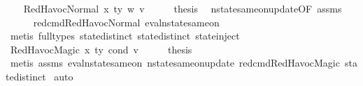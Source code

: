 \begin{isabellebody}
\isamarkupfalse%
\isanewline
\ \ \isamarkupfalse%
\ {\isacharparenleft}{\kern0pt}RedHavocNormal\ x\ ty\ w\ v{\isacharparenright}{\kern0pt}\isanewline
\ \ \isamarkupfalse%
\ \isamarkupfalse%
\ {\isacharquery}{\kern0pt}thesis\ \isamarkupfalse%
\ nstate{\isacharunderscore}{\kern0pt}same{\isacharunderscore}{\kern0pt}on{\isacharunderscore}{\kern0pt}update{\isacharunderscore}{\kern0pt}{}{\isacharbrackleft}{\kern0pt}OF\ assms{\isacharparenleft}{\kern0pt}{}{\isacharparenright}{\kern0pt}{\isacharbrackright}{\kern0pt}\isanewline
\ \ \ \ \isamarkupfalse%
\ red{\isacharunderscore}{\kern0pt}cmd{\isachardot}{\kern0pt}RedHavocNormal\ eval{\isacharunderscore}{\kern0pt}nstate{\isacharunderscore}{\kern0pt}same{\isacharunderscore}{\kern0pt}on{\isacharparenleft}{\kern0pt}{}{\isacharparenright}{\kern0pt}\isanewline
\ \ \ \ \isamarkupfalse%
\ {\isacharparenleft}{\kern0pt}metis\ {\isacharparenleft}{\kern0pt}full{\isacharunderscore}{\kern0pt}types{\isacharparenright}{\kern0pt}\ state{\isachardot}{\kern0pt}distinct{\isacharparenleft}{\kern0pt}{}{\isacharparenright}{\kern0pt}\ state{\isachardot}{\kern0pt}distinct{\isacharparenleft}{\kern0pt}{}{\isacharparenright}{\kern0pt}\ state{\isachardot}{\kern0pt}inject{\isacharparenright}{\kern0pt}\isanewline
{}\isamarkupfalse%
\isanewline
\ \ \isamarkupfalse%
\ {\isacharparenleft}{\kern0pt}RedHavocMagic\ x\ ty\ cond\ v{\isacharparenright}{\kern0pt}\isanewline
\ \ \isamarkupfalse%
\ \isamarkupfalse%
\ {\isacharquery}{\kern0pt}thesis\isanewline
\ \ \isamarkupfalse%
\ {\isacharparenleft}{\kern0pt}metis\ assms{\isacharparenleft}{\kern0pt}{}{\isacharparenright}{\kern0pt}\ eval{\isacharunderscore}{\kern0pt}nstate{\isacharunderscore}{\kern0pt}same{\isacharunderscore}{\kern0pt}on{\isacharparenleft}{\kern0pt}{}{\isacharparenright}{\kern0pt}\ nstate{\isacharunderscore}{\kern0pt}same{\isacharunderscore}{\kern0pt}on{\isacharunderscore}{\kern0pt}update{\isacharunderscore}{\kern0pt}{}\ red{\isacharunderscore}{\kern0pt}cmd{\isachardot}{\kern0pt}RedHavocMagic\ state{\isachardot}{\kern0pt}distinct{\isacharparenleft}{\kern0pt}{}{\isacharparenright}{\kern0pt}{\isacharparenright}{\kern0pt}\isanewline
{}\isamarkupfalse%
\ {\isacharparenleft}{\kern0pt}auto{\isacharparenright}{\kern0pt}%
\endisatagproof

\end{isabellebody}
